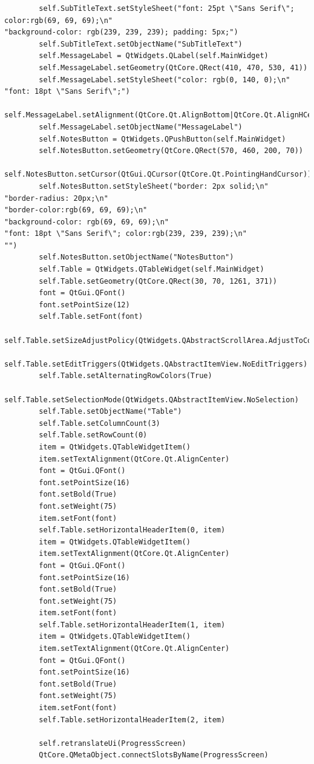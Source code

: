\documentclass[12pt]{article}
\begin{document}
\begin{lstlisting}
        self.SubTitleText.setStyleSheet("font: 25pt \"Sans Serif\"; color:rgb(69, 69, 69);\n"
"background-color: rgb(239, 239, 239); padding: 5px;")
        self.SubTitleText.setObjectName("SubTitleText")
        self.MessageLabel = QtWidgets.QLabel(self.MainWidget)
        self.MessageLabel.setGeometry(QtCore.QRect(410, 470, 530, 41))
        self.MessageLabel.setStyleSheet("color: rgb(0, 140, 0);\n"
"font: 18pt \"Sans Serif\";")
        self.MessageLabel.setAlignment(QtCore.Qt.AlignBottom|QtCore.Qt.AlignHCenter)
        self.MessageLabel.setObjectName("MessageLabel")
        self.NotesButton = QtWidgets.QPushButton(self.MainWidget)
        self.NotesButton.setGeometry(QtCore.QRect(570, 460, 200, 70))
        self.NotesButton.setCursor(QtGui.QCursor(QtCore.Qt.PointingHandCursor))
        self.NotesButton.setStyleSheet("border: 2px solid;\n"
"border-radius: 20px;\n"
"border-color:rgb(69, 69, 69);\n"
"background-color: rgb(69, 69, 69);\n"
"font: 18pt \"Sans Serif\"; color:rgb(239, 239, 239);\n"
"")
        self.NotesButton.setObjectName("NotesButton")
        self.Table = QtWidgets.QTableWidget(self.MainWidget)
        self.Table.setGeometry(QtCore.QRect(30, 70, 1261, 371))
        font = QtGui.QFont()
        font.setPointSize(12)
        self.Table.setFont(font)
        self.Table.setSizeAdjustPolicy(QtWidgets.QAbstractScrollArea.AdjustToContents)
        self.Table.setEditTriggers(QtWidgets.QAbstractItemView.NoEditTriggers)
        self.Table.setAlternatingRowColors(True)
        self.Table.setSelectionMode(QtWidgets.QAbstractItemView.NoSelection)
        self.Table.setObjectName("Table")
        self.Table.setColumnCount(3)
        self.Table.setRowCount(0)
        item = QtWidgets.QTableWidgetItem()
        item.setTextAlignment(QtCore.Qt.AlignCenter)
        font = QtGui.QFont()
        font.setPointSize(16)
        font.setBold(True)
        font.setWeight(75)
        item.setFont(font)
        self.Table.setHorizontalHeaderItem(0, item)
        item = QtWidgets.QTableWidgetItem()
        item.setTextAlignment(QtCore.Qt.AlignCenter)
        font = QtGui.QFont()
        font.setPointSize(16)
        font.setBold(True)
        font.setWeight(75)
        item.setFont(font)
        self.Table.setHorizontalHeaderItem(1, item)
        item = QtWidgets.QTableWidgetItem()
        item.setTextAlignment(QtCore.Qt.AlignCenter)
        font = QtGui.QFont()
        font.setPointSize(16)
        font.setBold(True)
        font.setWeight(75)
        item.setFont(font)
        self.Table.setHorizontalHeaderItem(2, item)

        self.retranslateUi(ProgressScreen)
        QtCore.QMetaObject.connectSlotsByName(ProgressScreen)


\end{lstlisting}
\end{document}
